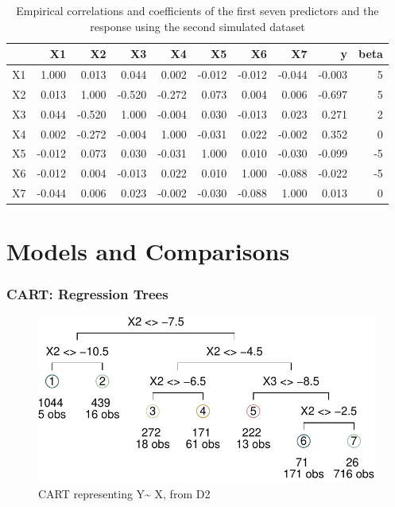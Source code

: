 \documentclass[12pt,twoside]{reedthesis}
\begin{document}
  \begin{table}
  
  \caption{\label{tab:unnamed-chunk-14}\label{tab:tabcorSim2}Empirical correlations and coefficients of the first seven predictors and the response using the second simulated dataset}
  \centering
  \begin{tabular}[t]{l|r|r|r|r|r|r|r|r|r}
  \hline
    & X1 & X2 & X3 & X4 & X5 & X6 & X7 & y & beta\\
  \hline
  X1 & 1.000 & 0.013 & 0.044 & 0.002 & -0.012 & -0.012 & -0.044 & -0.003 & 5\\
  \hline
  X2 & 0.013 & 1.000 & -0.520 & -0.272 & 0.073 & 0.004 & 0.006 & -0.697 & 5\\
  \hline
  X3 & 0.044 & -0.520 & 1.000 & -0.004 & 0.030 & -0.013 & 0.023 & 0.271 & 2\\
  \hline
  X4 & 0.002 & -0.272 & -0.004 & 1.000 & -0.031 & 0.022 & -0.002 & 0.352 & 0\\
  \hline
  X5 & -0.012 & 0.073 & 0.030 & -0.031 & 1.000 & 0.010 & -0.030 & -0.099 & -5\\
  \hline
  X6 & -0.012 & 0.004 & -0.013 & 0.022 & 0.010 & 1.000 & -0.088 & -0.022 & -5\\
  \hline
  X7 & -0.044 & 0.006 & 0.023 & -0.002 & -0.030 & -0.088 & 1.000 & 0.013 & 0\\
  \hline
  \end{tabular}
  \end{table}
  
  \section{Models and Comparisons}\label{models-and-comparisons}
  
  \subsubsection{CART: Regression Trees}\label{cart-regression-trees}
  
  \begin{figure}[htbp]
  \centering
  \includegraphics{Thesis_files/figure-latex/unnamed-chunk-16-1.pdf}
  \caption{\label{fig:unnamed-chunk-16}\label{fig:figcarts}CART representing
  Y\textasciitilde{} X, from D2}
  \end{figure}
  
\end{document}
